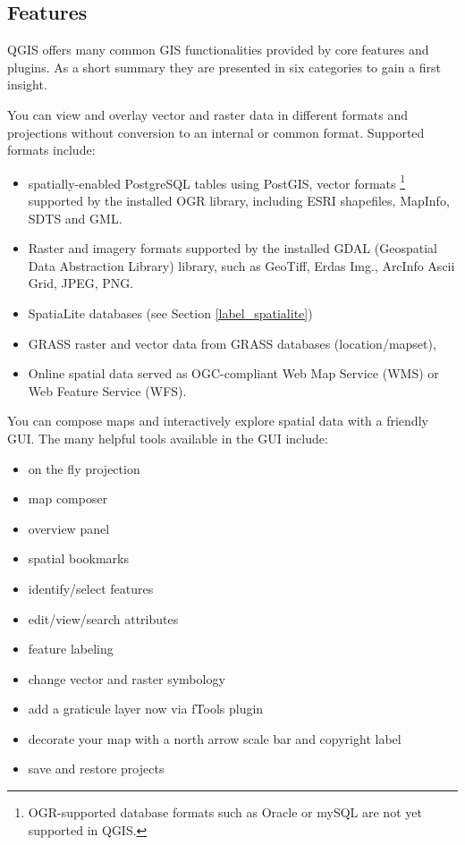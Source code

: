 \subsection{Features}\label{label_majfeat}

QGIS offers many common GIS functionalities provided by core features and
plugins. As a short summary they are presented in six categories to gain a
first insight.


You can view and overlay vector and raster data in different formats and
projections without conversion to an internal or common format. Supported
formats include:

\begin{itemize}
\item spatially-enabled PostgreSQL tables using PostGIS, vector formats
\footnote{OGR-supported database formats such as Oracle or mySQL are not yet
supported in QGIS.} supported by the installed OGR library, including ESRI
shapefiles, MapInfo, SDTS and GML.
\item Raster and imagery formats supported by the installed GDAL (Geospatial
Data Abstraction Library) library, such 
as GeoTiff, Erdas Img., ArcInfo Ascii Grid, JPEG, PNG.
\item SpatiaLite databases (see Section \ref{label_spatialite}) 
\item GRASS raster and vector data from GRASS databases (location/mapset), 
\item Online spatial data served as OGC-compliant Web Map Service (WMS) or
Web Feature Service (WFS).
\end{itemize}


You can compose maps and interactively explore spatial data with a friendly
GUI. The many helpful tools available in the GUI include:

\begin{itemize}
\item on the fly projection
\item map composer
\item overview panel
\item spatial bookmarks
\item identify/select features
\item edit/view/search attributes
\item feature labeling
\item change vector and raster symbology
\item add a graticule layer now via fTools plugin
\item decorate your map with a north arrow scale bar and copyright label
\item save and restore projects
\end{itemize}

